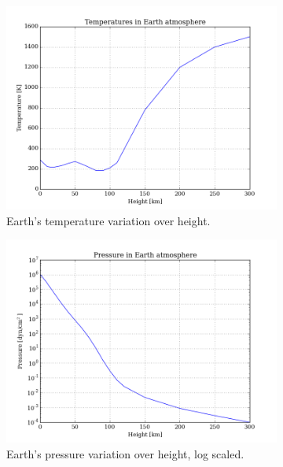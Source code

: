\documentclass[11pt,a4paper,notitlepage]{article}
\begin{document}
\begin{figure}[H]
\center

	\begin{subfigure}[t]{0.49\textwidth}
	\includegraphics[scale=0.42]{../figs/earth_temp.png}
	\caption{Earth's temperature variation over height.}
	\end{subfigure}
	\hfill	
	\begin{subfigure}[t]{0.49\textwidth}
	\includegraphics[scale=0.42]{../figs/earth_pressure.png}
	\caption{Earth's pressure variation over height, log scaled.}
	\end{subfigure}\\
	\begin{subfigure}[t]{0.49\textwidth}

\end{subfigure}
\end{figure}
\end{document}
